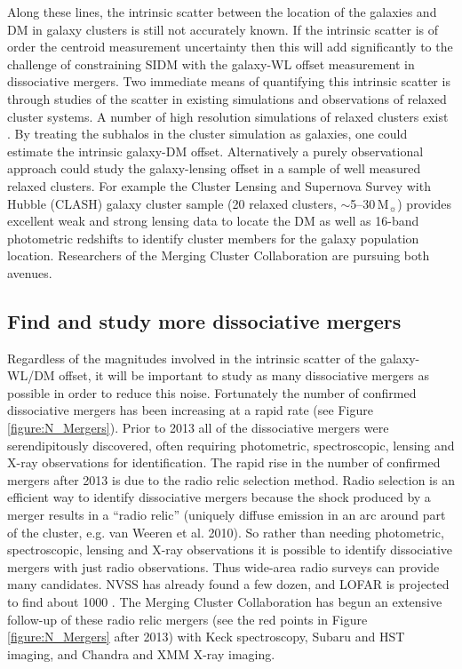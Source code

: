 Along these lines, the intrinsic scatter between the location of the galaxies and DM in galaxy clusters is still not accurately known.
If the intrinsic scatter is of order the centroid measurement uncertainty then this will add significantly to the challenge of constraining SIDM with the galaxy-WL offset measurement in dissociative mergers.
Two immediate means of quantifying this intrinsic scatter is through studies of the scatter in existing simulations and observations of relaxed cluster systems.
A number of high resolution simulations of relaxed clusters exist \citep[e.g.][, which include both CDM and SIDM simulation]{Peter:2012vi, Rocha:2012tr}.
By treating the subhalos in the cluster simulation as galaxies, one could estimate the intrinsic galaxy-DM offset.
Alternatively a purely observational approach could study the galaxy-lensing offset in a sample of well measured relaxed clusters.
For example the Cluster Lensing and Supernova Survey with Hubble (CLASH) galaxy cluster sample (20 relaxed clusters, $\sim$5--30\,M$_\sun$) provides excellent weak and strong lensing data to locate the DM as well as 16-band photometric redshifts to identify cluster members for the galaxy population location.
Researchers of the Merging Cluster Collaboration are pursuing both avenues.

\subsection{Find and study more dissociative mergers}

Regardless of the magnitudes involved in the intrinsic scatter of the galaxy-WL/DM offset, it will be important to study as many dissociative mergers as possible in order to reduce this noise.
Fortunately the number of confirmed dissociative mergers has been increasing at a rapid rate (see Figure \ref{figure:N_Mergers}).
Prior to 2013 all of the dissociative mergers were serendipitously discovered, often requiring photometric, spectroscopic, lensing and X-ray observations for identification.
The rapid rise in the number of confirmed mergers after 2013 is due to the radio relic selection method.
Radio selection is an efficient way to identify dissociative mergers because the shock produced by a merger results in a ``radio relic'' (uniquely diffuse emission in an arc around part of the cluster, e.g. van Weeren et al. 2010).
So rather than needing photometric, spectroscopic, lensing and X-ray observations it is possible to identify dissociative mergers with just radio observations.
Thus wide-area radio surveys can provide many candidates. 
NVSS has already found a few dozen, and LOFAR is projected to find about 1000 \citep{Nuza:2012fu}.
The Merging Cluster Collaboration has begun an extensive follow-up of these radio relic mergers (see the red points in Figure \ref{figure:N_Mergers} after 2013) with Keck spectroscopy, Subaru and HST imaging, and Chandra and XMM X-ray imaging.

